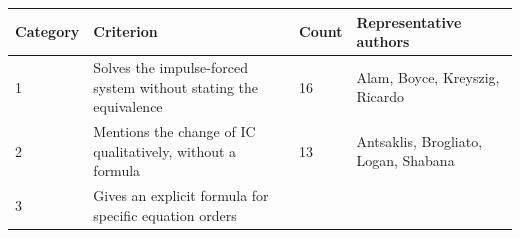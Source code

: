 \documentclass[
  11pt,
]{article}
\begin{document}
\begin{longtable}[]{@{}llll@{}}
\toprule
\begin{minipage}[b]{0.22\columnwidth}\raggedright
Category\strut
\end{minipage} & \begin{minipage}[b]{0.22\columnwidth}\raggedright
Criterion\strut
\end{minipage} & \begin{minipage}[b]{0.22\columnwidth}\raggedright
Count\strut
\end{minipage} & \begin{minipage}[b]{0.22\columnwidth}\raggedright
Representative authors\strut
\end{minipage}\tabularnewline
\midrule
\endhead
\begin{minipage}[t]{0.22\columnwidth}\raggedright
1\strut
\end{minipage} & \begin{minipage}[t]{0.22\columnwidth}\raggedright
Solves the impulse-forced system without stating the equivalence\strut
\end{minipage} & \begin{minipage}[t]{0.22\columnwidth}\raggedright
16\strut
\end{minipage} & \begin{minipage}[t]{0.22\columnwidth}\raggedright
Alam, Boyce, Kreyszig, Ricardo\strut
\end{minipage}\tabularnewline
\begin{minipage}[t]{0.22\columnwidth}\raggedright
2\strut
\end{minipage} & \begin{minipage}[t]{0.22\columnwidth}\raggedright
Mentions the change of IC qualitatively, without a formula\strut
\end{minipage} & \begin{minipage}[t]{0.22\columnwidth}\raggedright
13\strut
\end{minipage} & \begin{minipage}[t]{0.22\columnwidth}\raggedright
Antsaklis, Brogliato, Logan, Shabana\strut
\end{minipage}\tabularnewline
\begin{minipage}[t]{0.22\columnwidth}\raggedright
3\strut
\end{minipage} & \begin{minipage}[t]{0.22\columnwidth}\raggedright
Gives an explicit formula for specific equation orders\strut
\end{minipage} & \begin{minipage}[t]{0.22\columnwidth}\raggedright

\end{minipage}
\end{longtable}
\end{document}
